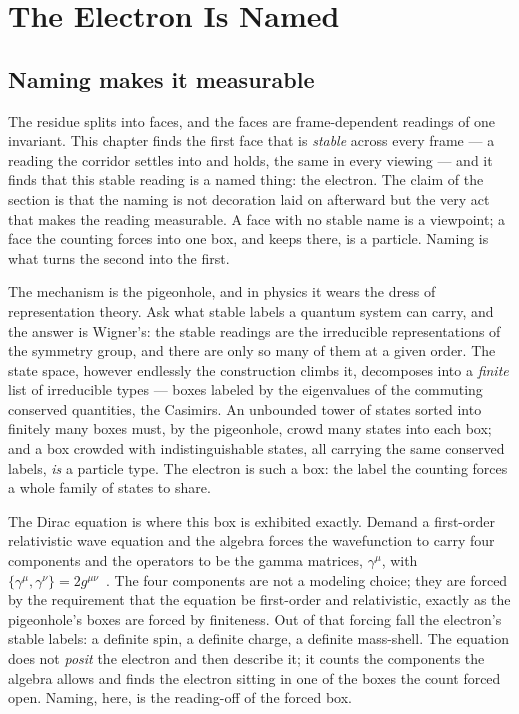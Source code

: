 \chapter{The Electron Is Named}

\section{Naming makes it measurable}

The residue splits into faces, and the faces are frame-dependent readings of one invariant. This chapter finds the first
face that is \emph{stable} across every frame --- a reading the corridor settles into and holds, the same in every viewing ---
and it finds that this stable reading is a named thing: the electron. The claim of the section is that the naming is not
decoration laid on afterward but the very act that makes the reading measurable. A face with no stable name is a viewpoint; a
face the counting forces into one box, and keeps there, is a particle. Naming is what turns the second into the first.

The mechanism is the pigeonhole, and in physics it wears the dress of representation theory. Ask what stable labels a
quantum system can carry, and the answer is Wigner's: the stable readings are the irreducible representations of the
symmetry group, and there are only so many of them at a given order. The state space, however endlessly the construction
climbs it, decomposes into a \emph{finite} list of irreducible types --- boxes labeled by the eigenvalues of the commuting
conserved quantities, the Casimirs. An unbounded tower of states sorted into finitely many boxes must, by the pigeonhole,
crowd many states into each box; and a box crowded with indistinguishable states, all carrying the same conserved labels,
\emph{is} a particle type. The electron is such a box: the label the counting forces a whole family of states to share.

The Dirac equation is where this box is exhibited exactly. Demand a first-order relativistic wave equation and the algebra
forces the wavefunction to carry four components and the operators to be the gamma matrices, $\gamma^\mu$, with
$\{\gamma^\mu, \gamma^\nu\} = 2 g^{\mu\nu}$~\cite{dirac1928}. The four components are not a modeling choice; they are forced
by the requirement that the equation be first-order and relativistic, exactly as the pigeonhole's boxes are forced by
finiteness. Out of that forcing fall the electron's stable labels: a definite spin, a definite charge, a definite mass-shell.
The equation does not \emph{posit} the electron and then describe it; it counts the components the algebra allows and finds
the electron sitting in one of the boxes the count forced open. Naming, here, is the reading-off of the forced box.

